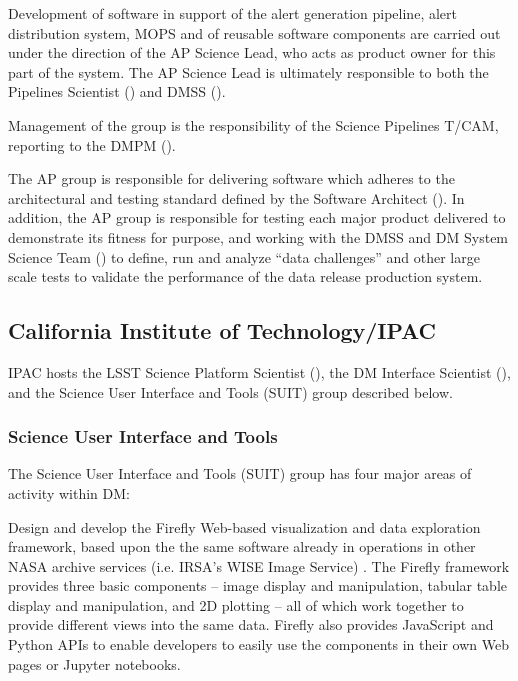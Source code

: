 Development of software in support of the alert generation \gls{pipeline}, alert distribution system, \gls{MOPS} and of reusable software components are carried out under the direction of the \gls{AP} Science Lead, who acts as product owner for this part of the system.
The \gls{AP} Science Lead is ultimately responsible to both the Pipelines Scientist () and \gls{DMSS} ().

Management of the group is the responsibility of the \gls{Science Pipelines} \gls{T/CAM}, reporting to the \gls{DMPM} ().

The \gls{AP} group is responsible for delivering software which adheres to the architectural and testing standard defined by the Software Architect ().
In addition, the \gls{AP} group is responsible for testing each major product delivered to demonstrate its fitness for purpose, and working with the \gls{DMSS} and \gls{DM} System Science Team () to define, run and analyze ``data challenges'' and other large scale tests to validate the performance of the data release production system.

\subsection {California Institute of Technology/IPAC\label{sect:ipac}}
IPAC hosts the \gls{LSST} \gls{Science Platform} Scientist (), the \gls{DM} Interface Scientist (), and the Science User Interface and Tools (\gls{SUIT}) group described below.

\subsubsection{ Science User Interface and Tools}

The Science User Interface and Tools (\gls{SUIT}) group has four major areas of activity within \gls{DM}:

Design and develop the \gls{Firefly} Web-based visualization and data exploration framework, based upon the the same software already in operations in other \gls{NASA} archive services (i.e. \gls{IRSA}’s \gls{WISE} Image Service) . The \gls{Firefly} framework provides three basic components –  image display and manipulation, tabular table display and manipulation, and \gls{2D} plotting – all of which work together to provide different views into the same data. \gls{Firefly} also provides JavaScript and Python APIs to enable developers to easily use the components in their own Web pages or Jupyter notebooks.

